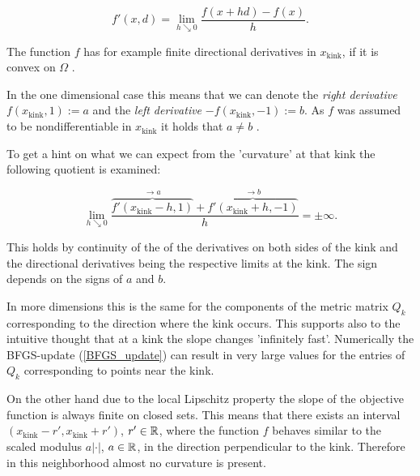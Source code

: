 \[ f'(x,d) = \lim_{h \searrow 0} \frac{f(x+h d)-f(x)}{h}. \]

The function \(f\) has for example finite directional derivatives in \(x_{\text{kink}}\), if it is convex on \(\Omega\) \cite[p. 144]{Stoer1970}.

In the one dimensional case this means that we can denote the \emph{right derivative} \(f(x_{\text{kink}},1) := a\) and the \emph{left derivative} \(-f(x_{\text{kink}},-1) := b\). As \(f\) was assumed to be nondifferentiable in \(x_{\text{kink}}\) it holds that \(a \neq b\) \cite[p. 213]{Rockafellar1970}.



To get a hint on what we can expect from the 'curvature' at that kink the following quotient is examined:


\[ \lim_{h \searrow 0} \frac{\overbrace{f'(x_{\text{kink}}-h,1)}^{\to a}+\overbrace{f'(x_{\text{kink}}+h,-1)}^{\to b}}{h} = \pm \infty. \]

This holds by continuity of the of the derivatives on both sides of the kink and the directional derivatives being the respective limits at the kink.
The sign depends on the signs of \(a\) and \(b\). 

In more dimensions this is the same for the components of the metric matrix \(Q_k\) corresponding to the direction where the kink occurs. This supports also to the intuitive thought that at a kink the slope changes 'infinitely fast'.
Numerically the BFGS-update (\ref{BFGS_update}) can result in very large values for the entries of \(Q_k\) corresponding to points near the kink.

On the other hand due to the local Lipschitz property the slope of the objective function is always finite on closed sets. This means that there exists an interval \((x_{\text{kink}}-r',x_{\text{kink}}+r')\), \(r' \in \mathbb{R}\), where the function \(f\) behaves similar to the scaled modulus \(a|\cdot|\), \(a \in \mathbb{R}\), in the direction perpendicular to the kink. Therefore in this neighborhood almost no curvature is present.


